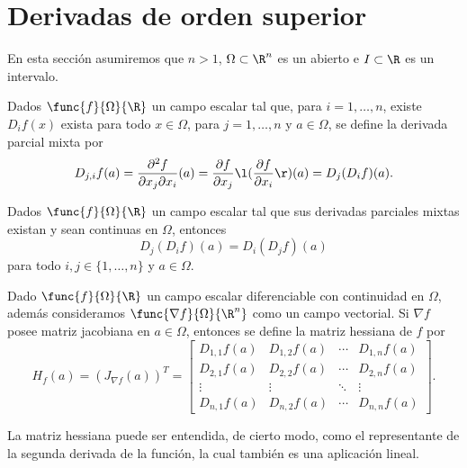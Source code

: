 \documentclass[a4,11pt]{aleph-notas}
\begin{document}

\section{Derivadas de orden superior}


En esta sección asumiremos que $n>1$, $\Omega\subset \R^n$ es un abierto e $I\subset \R$ es un intervalo.

\begin{defi}
    Dados $\func{f}{\Omega}{\R}$ un campo escalar tal que, para $i=1,\ldots, n$, existe $D_if(x)$ exista para todo $x\in \Omega$, para $j=1,\ldots, n$ y $a\in \Omega$, se define la derivada parcial mixta por
    \[
        D_{j,i} f(a)=\frac{\partial^2 f}{\partial x_j\partial x_i}(a)
        =\frac{\partial f}{\partial x_j}\l( \frac{\partial f}{\partial x_i}\r)(a)
        =D_j(D_i f)(a).
    \]
\end{defi}

\begin{teo}
    Dados $\func{f}{\Omega}{\R}$ un campo escalar tal que sus derivadas parciales mixtas existan y sean continuas en $\Omega$, entonces
    \[
        D_j(D_i f)(a) = D_i(D_j f)(a)
    \]
    para todo $i,j\in\{1,\ldots, n\}$ y $a\in \Omega$.
\end{teo}

\begin{defi}
    Dado $\func{f}{\Omega}{\R}$ un campo escalar diferenciable con continuidad en $\Omega$, además consideramos $\func{\nabla f}{\Omega}{\R^n}$ como un campo vectorial. Si $\nabla f$ posee matriz jacobiana en $a\in \Omega$, entonces se define la matriz hessiana de $f$ por
    \[
        H_f(a)= (J_{\nabla f} (a))^T = 
        \begin{bmatrix}
         D_{1,1}f(a) & D_{1,2}f(a) & \cdots & D_{1,n}f(a) \\
         D_{2,1}f(a) & D_{2,2}f(a) & \cdots & D_{2,n}f(a) \\
         \vdots & \vdots &  \ddots & \vdots\\
         D_{n,1}f(a) & D_{n,2}f(a) & \cdots & D_{n,n}f(a) 
        \end{bmatrix}.
    \]
\end{defi}
 

\begin{advertencia}
    La matriz hessiana puede ser entendida, de cierto modo, como el representante de la segunda derivada de la función, la cual también es una aplicación lineal.
\end{advertencia}
\end{document}

